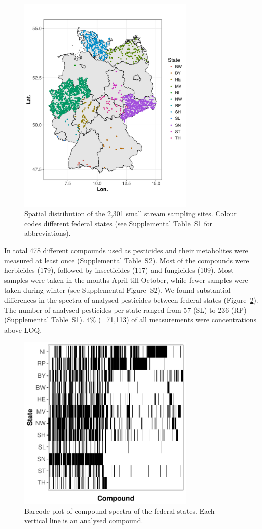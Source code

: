 \documentclass[journal=esthag,manuscript=article]{achemso}
\begin{document}
\begin{figure}[ht]
  \includegraphics[width=3.33in]{figure1.pdf}
  \caption{Spatial distribution of the 2,301 small stream sampling sites. Colour codes different federal states (see Supplemental Table~S1 for abbreviations).}
  \label{fig:fig1}
\end{figure}

In total 478 different compounds used as pesticides and their metabolites were measured at least once (Supplemental Table~S2). 
Most of the compounds were herbicides (179), followed by insecticides (117) and fungicides (109). %
Most samples were taken in the months April till October, while fewer samples were taken during winter (see Supplemental Figure~S2).
We found substantial differences in the spectra of analysed pesticides between federal states (Figure~\ref{fig:fig2}).
The number of analysed pesticides per state ranged from 57 (SL) to 236 (RP) (Supplemental Table~S1). 
4\% (=71,113) of all measurements were concentrations above LOQ.

\begin{figure}[ht]
  \includegraphics[width=3.33in]{figure2.pdf}
  \caption{Barcode plot of compound spectra of the federal states. Each vertical line is an analysed compound.}
  \label{fig:fig2}
\end{figure}
\end{document}
